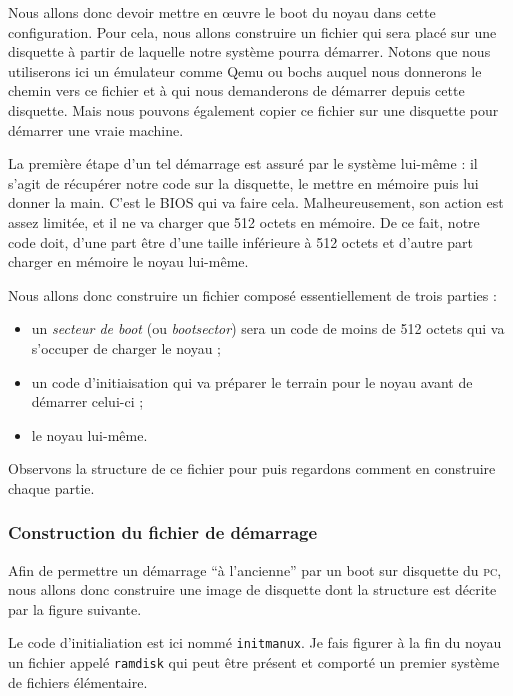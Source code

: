    Nous allons donc devoir mettre en \oe{}uvre le boot du noyau dans
cette configuration. Pour cela, nous allons construire un fichier qui
sera placé sur une disquette à partir de laquelle notre système pourra
démarrer. Notons que nous utiliserons ici un émulateur comme Qemu ou bochs
auquel nous donnerons le chemin vers ce fichier et à qui nous
demanderons de démarrer depuis cette disquette. Mais nous pouvons
également copier ce fichier sur une disquette pour démarrer une vraie
machine.

   La première étape d'un tel démarrage est assuré par le système
lui-même : il s'agit de récupérer notre code sur la disquette, le
mettre en mémoire puis lui donner la main. C'est le BIOS qui va faire
cela. Malheureusement, son action est assez limitée, et il ne va
charger que 512 octets en mémoire. De ce fait,
notre code doit, d'une part être d'une taille inférieure à 512 octets
et d'autre part charger en mémoire le noyau lui-même.

   Nous allons donc construire un fichier composé essentiellement de
trois parties :

\begin{itemize}
     \item un {\em secteur de boot} (ou {\em bootsector}) sera un code
       de moins de 512 octets qui va s'occuper de charger le noyau ;
     \item un code d'initiaisation qui va préparer le terrain pour le
       noyau avant de démarrer celui-ci ;
     \item le noyau lui-même.
\end{itemize}

   Observons la structure de ce fichier pour \manux puis regardons comment en
construire chaque partie.

%
\subsubsection{Construction du fichier de démarrage}

   Afin de permettre un démarrage ``à l'ancienne'' par un boot sur
disquette du \textsc{ pc}, nous allons donc construire une image de disquette
dont la structure est décrite par la figure suivante.

   Le code d'initialiation est ici nommé {\tt initmanux}. Je fais figurer
à la fin du noyau un fichier appelé {\tt ramdisk} qui peut être
présent et comporté un premier système de fichiers élémentaire.

